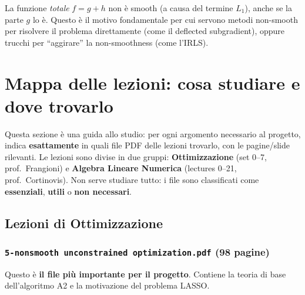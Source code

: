 \documentclass[a4paper,11pt]{article}
\theoremstyle{definition}
\begin{document}
\begin{attenzione}
La funzione \emph{totale} $f = g + h$ non è smooth (a causa del termine $L_1$), anche se la parte $g$ lo è. Questo è il motivo fondamentale per cui servono metodi non-smooth per risolvere il problema direttamente (come il deflected subgradient), oppure trucchi per ``aggirare'' la non-smoothness (come l'IRLS).
\end{attenzione}

\newpage
\section{Mappa delle lezioni: cosa studiare e dove trovarlo}
\label{sec:mappa_lezioni}

\begin{intuizione}
Questa sezione è una guida allo studio: per ogni argomento necessario al progetto, indica \textbf{esattamente} in quali file PDF delle lezioni trovarlo, con le pagine/slide rilevanti. Le lezioni sono divise in due gruppi: \textbf{Ottimizzazione} (set 0--7, prof.\ Frangioni) e \textbf{Algebra Lineare Numerica} (lectures 0--21, prof.\ Cortinovis). Non serve studiare tutto: i file sono classificati come \textbf{essenziali}, \textbf{utili} o \textbf{non necessari}.
\end{intuizione}

\subsection{Lezioni di Ottimizzazione}

\subsubsection*{ \quad \texttt{5-nonsmooth unconstrained optimization.pdf} (98 pagine)}

Questo è \textbf{il file più importante per il progetto}. Contiene la teoria di base dell'algoritmo A2 e la motivazione del problema LASSO.
\end{document}
